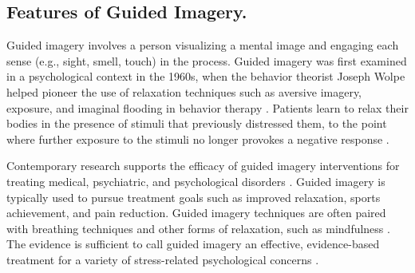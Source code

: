 \subsection*{Features of Guided Imagery.}

Guided imagery involves a person visualizing a mental image and engaging each sense (e.g., sight, smell, touch) in the process. Guided imagery was first examined in a psychological context in the 1960s, when the behavior theorist Joseph Wolpe helped pioneer the use of relaxation techniques such as aversive imagery, exposure, and imaginal flooding in behavior therapy \citep{achterberg1985imagery, utay2006review}. Patients learn to relax their bodies in the presence of stimuli that previously distressed them, to the point where further exposure to the stimuli no longer provokes a negative response \citep{achterberg1985imagery}.

Contemporary research supports the efficacy of guided imagery interventions for treating medical, psychiatric, and psychological disorders \citep{utay2006review}. Guided imagery is typically used to pursue treatment goals such as improved relaxation, sports achievement, and pain reduction. Guided imagery techniques are often paired with breathing techniques and other forms of relaxation, such as mindfulness \citep[see][]{freebird2012progressive}. The evidence is sufficient to call guided imagery an effective, evidence-based treatment for a variety of stress-related psychological concerns \citep{utay2006review}.
